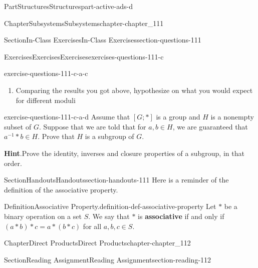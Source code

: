 \documentclass[oneside,10pt,]{book}
\newcommand{\blocktitlefont}{\relax}
\newcommand{\terminology}[1]{\textbf{#1}}
\numberwithin{equation}{section}
\begin{document}
\begin{partptx}{Part}{Structures}{}{Structures}{}{}{part-active-ads-d}
\begin{chapterptx}{Chapter}{Subsystems}{}{Subsystems}{}{}{chapter-chapter_111}
\begin{sectionptx}{Section}{In-Class Exercises}{}{In-Class Exercises}{}{}{section-questions-111}
\begin{exercises-subsection-numberless}{Exercises}{Exercises}{}{Exercises}{}{}{exercises-questions-111-c}
\begin{exercisegroup}
\begin{divisionexerciseeg}{3}{}{}{exercise-questions-111-c-a-c}
\begin{enumerate}[label=(\alph*)]
\item{}Comparing the results you got above, hypothesize on what you would expect for different moduli%
\end{enumerate}
%
\end{divisionexerciseeg}%
\begin{divisionexerciseeg}{4}{}{}{exercise-questions-111-c-a-d}%
Assume that \([G;*]\) is a group and \(H\) is a nonempty subset of \(G\). Suppose that we are told that for \(a, b \in H\), we are guaranteed that \(a^{-1}*b \in H\).  Prove that \(H\) is a subgroup of \(G\).%
\par\smallskip%
\noindent\textbf{\blocktitlefont Hint}.\hypertarget{hint-questions-111-c-a-d-b}{}\quad{}Prove the identity, inverses and closure properties of a subgroup, in that order.%
\end{divisionexerciseeg}%
\end{exercisegroup}
\par\medskip\noindent
\end{exercises-subsection-numberless}
\end{sectionptx}
%
%
\typeout{************************************************}
\typeout{************************************************}
%
\begin{sectionptx}{Section}{Handouts}{}{Handouts}{}{}{section-handouts-111}
Here is a reminder of the definition of the associative property.%
\begin{definition}{Definition}{Associative Property.}{definition-def-associative-property}%
%
Let \(*\) be a binary operation on a set \(S\). We say that \(*\) is  \terminology{associative}  if and only if \((a * b) * c = a * (b * c)\) for all \(a, b, c \in  S\).%
\end{definition}
\end{sectionptx}
\end{chapterptx}
%
\typeout{************************************************}
\typeout{************************************************}
%
\begin{chapterptx}{Chapter}{Direct Products}{}{Direct Products}{}{}{chapter-chapter_112}
\renewcommand*{\chaptername}{Chapter}
%
%
%
\typeout{************************************************}
\typeout{************************************************}
%
\begin{sectionptx}{Section}{Reading Assignment}{}{Reading Assignment}{}{}{section-reading-112}

\end{sectionptx}
\end{chapterptx}
\end{partptx}
\end{document}
